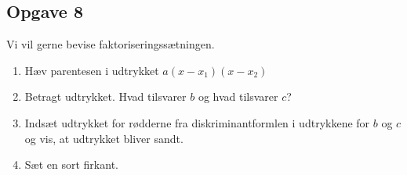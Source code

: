 \subsection*{Opgave 8}
Vi vil gerne bevise faktoriseringssætningen. 
\begin{enumerate}[label=\roman*)]
	\item Hæv parentesen i udtrykket $a(x-x_1)(x-x_2)$
	\item Betragt udtrykket. Hvad tilsvarer $b$ og hvad tilsvarer $c$?
	\item Indsæt udtrykket for rødderne fra diskriminantformlen i udtrykkene for $b$ og $c$ og vis, at 
	udtrykket bliver sandt. 
	\item Sæt en sort firkant.
\end{enumerate}
